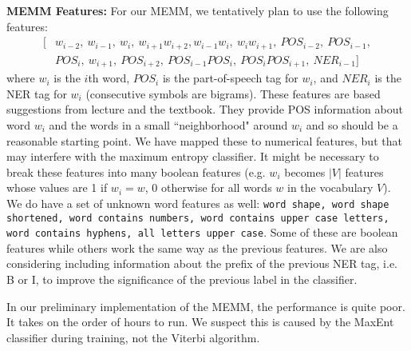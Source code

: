 \documentclass[12pt]{article}
\begin{document}
\textbf{MEMM Features:}
For our MEMM, we tentatively plan to use the following features:
\begin{equation*}
\begin{split}
[&w_{i - 2},\ w_{i - 1},\ w_i,\ w_{i + 1}w_{i + 2}, 
w_{i - 1}w_i,\ w_iw_{i + 1},\ POS_{i - 2},\ POS_{i - 1},\\ &POS_i,\ w_{i + 1},\ POS_{i + 2}, \ POS_{i - 1}POS_i,\ POS_iPOS_{i + 1},\ NER_{i - 1}]
\end{split}
\end{equation*}
where $w_i$ is the $i$th word, $POS_i$ is the part-of-speech tag for $w_i$, and $NER_i$ is the NER tag for $w_i$ (consecutive symbols are bigrams). These features are based suggestions from lecture and the textbook. They provide POS information about word $w_i$ and the words in a small ``neighborhood" around $w_i$ and so should be a reasonable starting point. We have mapped these to numerical features, but that may interfere with the maximum entropy classifier. It might be necessary to break these features into many boolean features (e.g. $w_i$ becomes $|V|$ features whose values are 1 if $w_i = w$, 0 otherwise for all words $w$ in the vocabulary $V$). We do have a set of unknown word features as well:
{\tt word shape, word shape shortened, word contains numbers, word contains upper case letters, word contains hyphens, all letters upper case}. Some of these are boolean features while others work the same way as the previous features. We are also considering including information about the prefix of the previous NER tag, i.e. B or I, to improve the significance of the previous label in the classifier.

In our preliminary implementation of the MEMM, the performance is quite poor. It takes on the order of hours to run. We suspect this is caused by the MaxEnt classifier during training, not the Viterbi algorithm.
   
\end{document}
